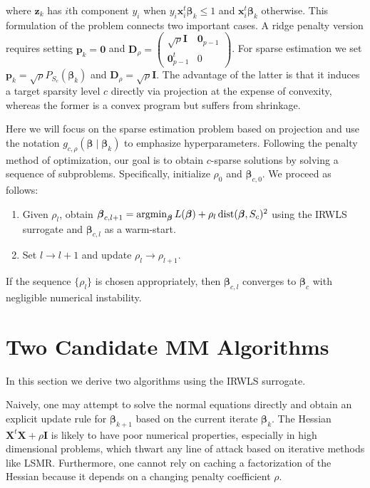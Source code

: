\documentclass[11pt]{article}
\def\dist{\mathop{\rm dist}\nolimits}
\def\argmin{\mathop{\rm argmin}\nolimits}
\newcommand{\bzero}{\boldsymbol{0}}
\newcommand{\bp}{\boldsymbol{p}}
\newcommand{\bx}{\boldsymbol{x}}
\newcommand{\bz}{\boldsymbol{z}}
\newcommand{\bD}{\boldsymbol{D}}
\newcommand{\bI}{\boldsymbol{I}}
\newcommand{\bX}{\boldsymbol{X}}
\newcommand{\bbeta}{\boldsymbol{\beta}}
\begin{document}
where $\bz_k$ has $i$th component $y_i$ when $y_i \bx_i^t\bbeta_k \le 1$
and $\bx_i^t\bbeta_k$ otherwise. 
This formulation of the problem connects two important cases.
A ridge penalty version requires setting $\bp_{k} = \bzero$ and $\bD_{\rho} = \begin{pmatrix} \sqrt{\rho} \bI & \bzero_{p-1} \\ \bzero_{p-1}^{t} & 0 \end{pmatrix}$.
For sparse estimation we set $\bp_k = \sqrt{\rho} P_{S_{c}}(\bbeta_k)$ and $\bD_{\rho} = \sqrt{\rho} \bI$.
The advantage of the latter is that it induces a target sparsity level $c$ directly via projection at the expense of convexity, whereas the former is a convex program but suffers from shrinkage.

Here we will focus on the sparse estimation problem based on projection and use the notation $g_{c,\rho}(\bbeta \mid \bbeta_{k})$ to emphasize hyperparameters.
Following the penalty method of optimization, our goal is to obtain $c$-sparse solutions by solving a sequence of subproblems.
Specifically, initialize $\rho_{0}$ and $\bbeta_{c,0}$.
We proceed as follows:
\begin{enumerate}
    \item Given $\rho_{l}$, obtain $\bbeta_{c,l+1} = \argmin_{\bbeta} L(\bbeta) + \rho_{l} \dist(\bbeta, S_{c})^{2}$ using the IRWLS surrogate and $\bbeta_{c,l}$ as a warm-start.
    \item Set $l \to l + 1$ and update $\rho_{l} \to \rho_{l+1}$.
\end{enumerate}
If the sequence $\{\rho_{l}\}$ is chosen appropriately, then $\bbeta_{c,l}$ converges to $\bbeta_{c}$ with negligible numerical instability.

\section*{\center Two Candidate MM Algorithms}
In this section we derive two algorithms using the IRWLS surrogate.

Naively, one may attempt to solve the normal equations directly and obtain an explicit update rule for $\bbeta_{k+1}$ based on the current iterate $\bbeta_{k}$.
The Hessian $\bX^{t} \bX + \rho \bI$ is likely to have poor numerical properties, especially in high dimensional problems, which thwart any line of attack based on iterative methods like LSMR.
Furthermore, one cannot rely on caching a factorization of the Hessian because it depends on a changing penalty coefficient $\rho$.
\end{document}
